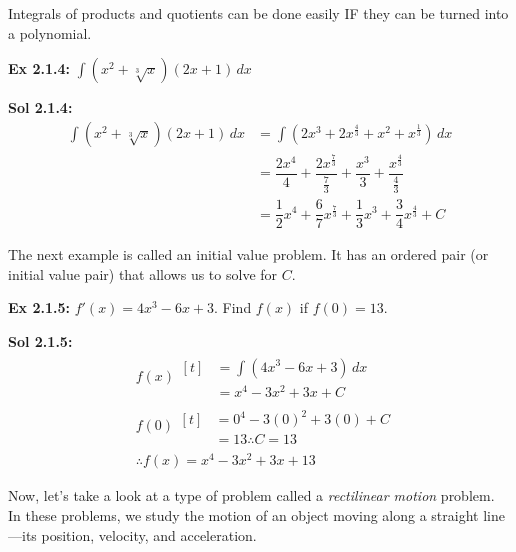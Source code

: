 Integrals of products and quotients can be done easily IF they can be turned into a polynomial. \par

\begin{tcolorbox}[example]
    \textbf{Ex 2.1.4: } $\int \left(x^2 + \sqrt[3]{x}\right)(2x + 1) \, dx$
\end{tcolorbox}
\begin{tcolorbox}[solution]
    \textbf{Sol 2.1.4: } \begin{align*}
        \int \left(x^2 + \sqrt[3]{x}\right)(2x + 1) \, dx &= \int \left(2x^3 + 2x^{\frac{4}{3}} + x^2 + x^{\frac{1}{3}}\right) \, dx \\[11pt]
        & = \dfrac{2x^4}{4} + \dfrac{2x^{\frac{7}{3}}}{\frac{7}{3}} + \dfrac{x^3}{3} + \dfrac{x^{\frac{4}{3}}}{\frac{4}{3}} \\[11pt]
        & = \boxed{\dfrac{1}{2}x^4 + \dfrac{6}{7}x^{\frac{7}{3}} + \dfrac{1}{3}x^3 + \dfrac{3}{4}x^{\frac{4}{3}} + C}
    \end{align*}
\end{tcolorbox}

The next example is called an initial value problem. It has an ordered pair (or initial value pair) that allows us to solve for $C$. \par

\begin{tcolorbox}[example]
    \textbf{Ex 2.1.5: } $f'(x) = 4x^3 - 6x + 3$. Find $f(x)$ if $f(0) = 13$.
\end{tcolorbox} 
\begin{tcolorbox}[solution]
    \textbf{Sol 2.1.5: } \begin{align*}
        & f(x) \begin{aligned}[t]
            & = \int \left(4x^3 - 6x + 3\right) \, dx \\[11pt]
            & = x^4 - 3x^2 + 3x + C 
        \end{aligned} \\[11pt]
        & f(0) \begin{aligned}[t]
            & = 0^4 - 3(0)^2 + 3(0) + C \\[11pt]
            & = 13 \therefore C = 13 
        \end{aligned} \\[11pt]
        & \therefore \boxed{f(x) = x^4 - 3x^2 + 3x + 13}
    \end{align*}
\end{tcolorbox}

Now, let's take a look at a type of problem called a \textit{rectilinear motion} problem. In these problems, we study the motion of an object moving along a straight line—its position, velocity, and acceleration. \par

